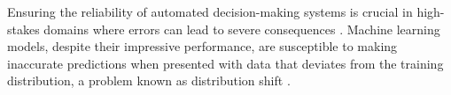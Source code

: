 Ensuring the reliability of automated decision-making systems is crucial in high-stakes domains where errors can lead to severe consequences \cite{amodei2016concrete}. Machine learning models, despite their impressive performance, are susceptible to making inaccurate predictions when presented with data that deviates from the training distribution, a problem known as distribution shift \cite{hendrycks2021many, quinonero2009dataset}.





